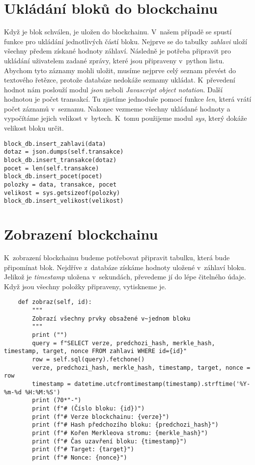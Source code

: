 \documentclass[12pt]{report}			%
\begin{document}
{	\section{Ukládání bloků do blockchainu}{
Když je blok schválen, je uložen do blockchainu. V~našem případě se spustí funkce pro ukládání jednotlivých částí bloku. Nejprve se do tabulky \textit{zahlavi} uloží všechny předem získané hodnoty záhlaví. Následně je potřeba připravit pro ukládání uživatelem zadané zprávy, které jsou připraveny v~python listu. Abychom tyto záznamy mohli uložit, musíme nejprve celý seznam převést do textového řetězce, protože databáze nedokáže seznamy ukládat. K~převedení hodnot nám poslouží modul \textit{json} neboli \textit{Javascript object notation}. Další hodnotou je počet transakcí. Tu zjistíme jednoduše pomocí funkce \textit{len}, která vrátí počet záznamů v~seznamu. Nakonec vezmeme všechny ukládané hodnoty a vypočítáme jejich velikost v~bytech. K~tomu použijeme modul \textit{sys}, který dokáže velikost bloku určit.
} 
\begin{lstlisting}
block_db.insert_zahlavi(data)
dotaz = json.dumps(self.transakce)
block_db.insert_transakce(dotaz)
pocet = len(self.transakce)
block_db.insert_pocet(pocet)
polozky = data, transakce, pocet
velikost = sys.getsizeof(polozky)
block_db.insert_velikost(velikost)
\end{lstlisting}
	\section{Zobrazení blockchainu}
K~zobrazení blockchainu budeme potřebovat připravit tabulku, která bude připomínat blok. Nejdříve z~databáze získáme hodnoty uložené v~záhlaví bloku. Jelikož je \textit{timestamp} uložena v~sekundách, převedeme jí do lépe čitelného údaje. Když jsou všechny položky připraveny, vytiskneme je.
\begin{lstlisting}	
	def zobraz(self, id):
        """
        Zobrazí všechny prvky obsažené v~jednom bloku
        """
        print ("")
        query = f"SELECT verze, predchozi_hash, merkle_hash, timestamp, target, nonce FROM zahlavi WHERE id={id}" 
        row = self.sql(query).fetchone()
        verze, predchozi_hash, merkle_hash, timestamp, target, nonce = row
        timestamp = datetime.utcfromtimestamp(timestamp).strftime('%Y-%m-%d %H:%M:%S')
        print (70*"-") 
        print (f"# (Číslo bloku: {id})")   
        print (f"# Verze blockchainu: {verze}")
        print (f"# Hash předchozího bloku: {predchozi_hash}")
        print (f"# Kořen Merkleova stromu: {merkle_hash}")
        print (f"# Čas uzavření bloku: {timestamp}")
        print (f"# Target: {target}")
        print (f"# Nonce: {nonce}")
\end{lstlisting}

}
\end{document}
